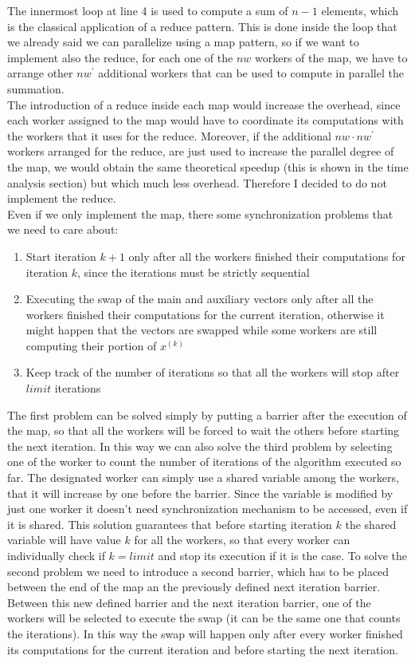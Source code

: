 \documentclass[12pt]{article}
\begin{document}
	The innermost loop at line 4 is used to compute a sum of $n-1$ elements, which is the classical application of a reduce pattern. This is done inside the loop that we already said we can parallelize using a map pattern, so if we want to implement also the reduce, for each one of the $nw$ workers of the map, we have to arrange other $nw^\prime$ additional workers that can be used to compute in parallel the summation.\\
	The introduction of a reduce inside each map would increase the overhead, since each worker assigned to the map would have to coordinate its computations with the workers that it uses for the reduce. Moreover, if the additional $nw\cdot nw^\prime$ workers arranged for the reduce, are just used to increase the parallel degree of the map, we would obtain the same theoretical speedup (this is shown in the time analysis section) but which much less overhead. Therefore I decided to do not implement the reduce.\\
	Even if we only implement the map, there some synchronization problems that we need to care about:
	\begin{enumerate}
		\item Start iteration $k+1$ only after all the workers finished their computations for iteration $k$, since the iterations must be strictly sequential 
		\item Executing the swap of the main and auxiliary vectors only after all the workers finished their computations for the current iteration, otherwise it might happen that the vectors are swapped while some workers are still computing their portion of $x^{(k)}$
		\item Keep track of the number of iterations so that all the workers will stop after $limit$ iterations
	\end{enumerate}
	The first problem can be solved simply by putting a barrier after the execution of the map, so that all the workers will be forced to wait the others before starting the next iteration. In this way we can also solve the third problem by selecting one of the worker to count the number of iterations of the algorithm executed so far. The designated worker can simply use a shared variable among the workers, that it will increase by one before the barrier. Since the variable is modified by just one worker it doesn't need synchronization mechanism to be accessed, even if it is shared. This solution guarantees that before starting iteration $k$ the shared variable will have value $k$ for all the workers, so that every worker can individually check if $k = limit$ and stop its execution if it is the case. To solve the second problem we need to introduce a second barrier, which has to be placed between the end of the map an the previously defined next iteration barrier. Between this new defined barrier and the next iteration barrier, one of the workers will be selected to execute the swap (it can be the same one that counts the iterations). In this way the swap will happen only after every worker finished its computations for the current iteration and before starting the next iteration.\\
\end{document}
